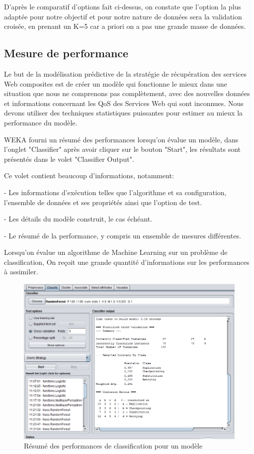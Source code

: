 D'après le comparatif d'options fait ci-dessus, on constate que l'option la plus adaptée pour notre objectif et pour notre nature de données sera la validation croisée, en prenant un  K=5 car a priori on a pas une grande masse de données.

\subsection{Mesure de performance}


Le but de la modélisation prédictive de la stratégie de récupération des services Web composites est de créer un modèle qui fonctionne le mieux dans une situation que nous ne comprenons pas complètement, avec des nouvelles données et informations concernant les QoS des Services Web qui sont inconnues. Nous devons utiliser des techniques statistiques puissantes pour estimer au mieux la performance du modèle.

WEKA fourni un résumé des performances lorsqu'on évalue un modèle, dans l'onglet "Classifier" après avoir cliquer sur le bouton "Start", les résultats sont présentés dans le volet "Classifier Output".

Ce volet contient beaucoup d'informations, notamment:

- Les informations d'exécution telles que l'algorithme et sa configuration, l'ensemble de données et ses propriétés ainsi que l'option de test.

- Les détails du modèle construit, le cas échéant.

- Le résumé de la performance, y compris un ensemble de mesures différentes.

Lorsqu'on évalue un algorithme de Machine Learning sur un problème de classification, On reçoit une grande quantité d'informations sur les performances à assimiler.


\begin{figure}[H]
\begin{center}
\includegraphics[width=1\linewidth]{images/summaryPerf.PNG}
\end{center}
\caption{Résumé des performances de classification pour un modèle}
\label{fig:14}
\end{figure}

